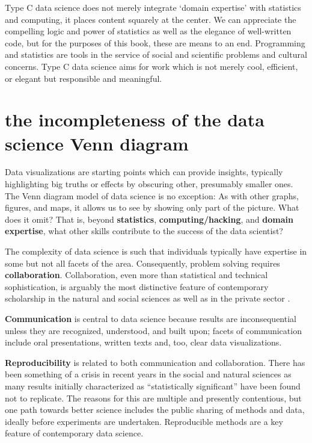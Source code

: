 \documentclass[
  openany]{book}
\begin{document}
Type C data science does not merely integrate `domain expertise' with statistics and computing, it places content squarely at the center. We can appreciate the compelling logic and power of statistics as well as the elegance of well-written code, but for the purposes of this book, these are means to an end. Programming and statistics are tools in the service of social and scientific problems and cultural concerns. Type C data science aims for work which is not merely cool, efficient, or elegant but responsible and meaningful.

\hypertarget{the-incompleteness-of-the-data-science-venn-diagram}{%
\section{the incompleteness of the data science Venn diagram}\label{the-incompleteness-of-the-data-science-venn-diagram}}

Data visualizations are starting points which can provide insights, typically highlighting big truths or effects by obscuring other, presumably smaller ones. The Venn diagram model of data science is no exception: As with other graphs, figures, and maps, it allows us to see by showing only part of the picture. What does it omit? That is, beyond \textbf{statistics}, \textbf{computing/hacking}, and \textbf{domain expertise}, what other skills contribute to the success of the data scientist?

The complexity of data science is such that individuals typically have expertise in some but not all facets of the area. Consequently, problem solving requires \textbf{collaboration}. Collaboration, even more than statistical and technical sophistication, is arguably the most distinctive feature of contemporary scholarship in the natural and social sciences as well as in the private sector \citep{isaacson2014innovators}.

\textbf{Communication} is central to data science because results are inconsequential unless they are recognized, understood, and built upon; facets of communication include oral presentations, written texts and, too, clear data visualizations.

\textbf{Reproducibility} is related to both communication and collaboration. There has been something of a crisis in recent years in the social and natural sciences as many results initially characterized as ``statistically significant'' have been found not to replicate. The reasons for this are multiple and presently contentious, but one path towards better science includes the public sharing of methods and data, ideally before experiments are undertaken. Reproducible methods are a key feature of contemporary data science.
\end{document}
